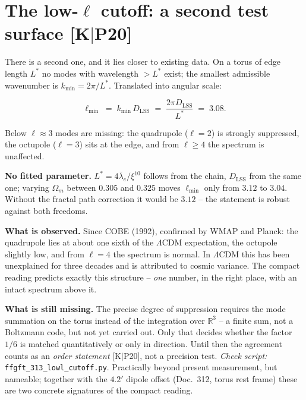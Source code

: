 \documentclass[11pt]{report}
\begin{document}
\section{The low-$\ell$ cutoff: a second test surface [K$|$P20]}

There is a second one, and it lies closer to existing data. On a
torus of edge length $L^{*}$ no modes with wavelength $> L^{*}$
exist; the smallest admissible wavenumber is
$k_\text{min} = 2\pi/L^{*}$. Translated into angular scale:

\begin{equation}
  \ell_\text{min} \;=\; k_\text{min}\,D_\text{LSS}
  \;=\; \frac{2\pi D_\text{LSS}}{L^{*}} \;=\; 3.08 .
\end{equation}

\noindent Below $\ell \approx 3$ modes are missing: the
quadrupole ($\ell = 2$) is strongly suppressed, the octupole
($\ell = 3$) sits at the edge, and from $\ell \ge 4$ the spectrum
is unaffected.

\textbf{No fitted parameter.} $L^{*} = 4\bar\lambda_e/\xi^{10}$
follows from the chain, $D_\text{LSS}$ from the same one; varying
$\Omega_m$ between $0.305$ and $0.325$ moves $\ell_\text{min}$
only from $3.12$ to $3.04$. Without the fractal path correction it
would be $3.12$ -- the statement is robust against both freedoms.

\textbf{What is observed.} Since COBE (1992), confirmed by WMAP
and Planck: the quadrupole lies at about one sixth of the
$\Lambda$CDM expectation, the octupole slightly low, and from
$\ell = 4$ the spectrum is normal. In $\Lambda$CDM this has been
unexplained for three decades and is attributed to cosmic
variance. The compact reading predicts exactly this structure --
\emph{one} number, in the right place, with an intact spectrum
above it.

\textbf{What is still missing.} The precise degree of suppression
requires the mode summation on the torus instead of the
integration over $\mathbb{R}^3$ -- a finite sum, not a Boltzmann
code, but not yet carried out. Only that decides whether the
factor $1/6$ is matched quantitatively or only in direction. Until
then the agreement counts as an \emph{order statement}
[K$|$P20], not a precision test. \emph{Check script:}
\texttt{ffgft\_313\_lowl\_cutoff.py}. Practically beyond present measurement,
but nameable; together with the $4.2'$ dipole offset (Doc.~312,
torus rest frame) these are two concrete signatures of the compact
reading.

\end{document}
